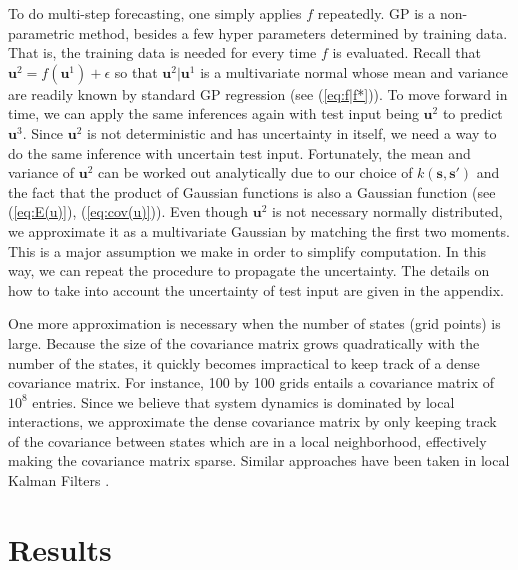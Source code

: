 \documentclass[11pt, reqno]{amsart}
\begin{document}
To do multi-step forecasting, one simply applies $f$ repeatedly. GP is a non-parametric method, besides a few hyper parameters determined by training data. That is, the training data is needed for every time $f$ is evaluated. Recall that $\mathbf{u}^{2}=f(\mathbf{u}^{1})+\epsilon$ so that $\mathbf{u}^{2}\vert\mathbf{u}^{1}$ is a multivariate normal whose mean and variance are readily known by standard GP regression (see (\ref{eq:f|f*})). To move forward in time, we can apply the same inferences again with test input being $\mathbf{u}^{2}$ to predict $\mathbf{u}^3$. Since $\mathbf{u}^{2}$ is not deterministic and has uncertainty in itself, we need a way to do the same inference with uncertain test input. Fortunately, the mean and variance of $\mathbf{u}^{2}$ can be worked out analytically due to our choice of $k(\mathbf{s},\mathbf{s}')$ and the fact that the product of Gaussian functions is also a Gaussian function (see (\ref{eq:E(u)}), (\ref{eq:cov(u)})). Even though $\mathbf{u}^{2}$ is not necessary normally distributed, we approximate it as a multivariate Gaussian by matching the first two moments. This is a major assumption we make in order to simplify computation. In this way, we can repeat the procedure to propagate the uncertainty. The details on how to take into account the uncertainty of test input are given in the appendix.

One more approximation is necessary when the number of states (grid points) is large. Because the size of the covariance matrix grows quadratically with the number of the states, it quickly becomes impractical to keep track of a dense covariance matrix. For instance, 100 by 100 grids entails a covariance matrix of $10^{8}$ entries. Since we believe that system dynamics is dominated by local interactions, we approximate the dense covariance matrix by only keeping track of the covariance between states which are in a local neighborhood, effectively making the covariance matrix sparse. Similar approaches have been taken in local Kalman Filters \citep{Hunt2007}.


\section{Results} \label{sec:syn-data}
\end{document}

